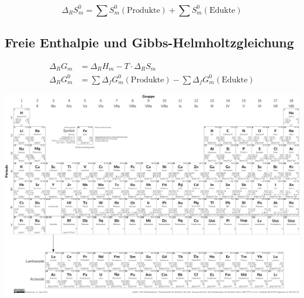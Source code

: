 \begin{equation}
\Delta_R S_m^0 = \sum S_m^0\left(\text{Produkte}\right) + \sum S_m^0\left(\text{Edukte}\right)
\end{equation}

\subsection{Freie Enthalpie und Gibbs-Helmholtzgleichung}

\begin{align}
\Delta_R G_m &= \Delta_R H_m - T \cdot \Delta_R S_m\\
\Delta_R G_m^0 &= \sum\Delta_fG_m^0\left(\text{Produkte}\right) - \sum\Delta_fG_m^0\left(\text{Edukte}\right)
\end{align}



\onecolumn
\includegraphics[angle=90,height=.95\textheight]{elemente/periodictable_monochrome}
